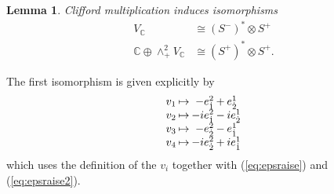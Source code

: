 \documentclass[twoside]{amsart}
\newcommand{\tighten}{\setlength{\arraycolsep}{1pt}}
\newcommand{\CC}{\ensuremath{\mathbb{C}}}
\newtheorem{lemma}{Lemma}
\renewcommand{\eqref}[1]{(\ref{eq:#1})}
\newcommand{\enm}[1]{\ensuremath{#1}}
\newcommand{\spl}{\enm{S^{+}}}
\newcommand{\sm}{\enm{S^{-}}}
\newcommand{\spd}{\enm{(\spl)^{*}}}
\newcommand{\smd}{\enm{(\sm)^{*}}}
\newcommand{\upperlowerabc}[3]{\enm{{#1}^{#2}_{#3}}}
\newcommand{\upperdotlowerabc}[3]{\upperlowerabc{#1}{#2}{\dot{#3}}}
\newcommand{\eudl}[2]{\upperdotlowerabc{e}{#1}{#2}}
\begin{document}
\begin{lemma}
    \label{lemma:stov}
    Clifford multiplication induces isomorphisms
    \begin{align*}
        V_{\CC} &\cong \smd\otimes\spl \\
        \CC\oplus\wedge^{2}_{+}V_{\CC} &\cong \spd\otimes\spl.
    \end{align*}
\end{lemma}

\proof The first isomorphism is given explicitly by
\begin{equation}
    \label{eq:vtohom}
    \tighten{
    \begin{array}{rcrcl}
        v_{1} & \mapsto & -\eudl{2}{1} & + & \eudl{1}{2} \\
        v_{2} & \mapsto & -i\eudl{2}{1} & - & i\eudl{1}{2} \\
        v_{3} & \mapsto & -\eudl{2}{2} & - & \eudl{1}{1} \\
        v_{4} & \mapsto & -i\eudl{2}{2} & + & i\eudl{1}{1} \\
    \end{array}}
\end{equation}
which uses the definition of the \( v_{i} \) together with
\eqref{epsraise} and \eqref{epsraise2}.
\end{document}
